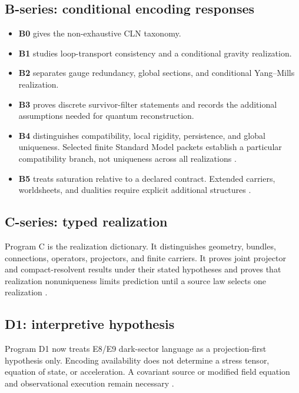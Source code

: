 \documentclass[11pt]{article}
\begin{document}
\subsection{B-series: conditional encoding responses}

\begin{itemize}
\item \textbf{B0} gives the non-exhaustive CLN taxonomy.
\item \textbf{B1} studies loop-transport consistency and a conditional gravity
realization.
\item \textbf{B2} separates gauge redundancy, global sections, and conditional
Yang--Mills realization.
\item \textbf{B3} proves discrete survivor-filter statements and records the
additional assumptions needed for quantum reconstruction.
\item \textbf{B4} distinguishes compatibility, local rigidity, persistence,
and global uniqueness.  Selected finite Standard Model packets establish a
particular compatibility branch, not uniqueness across all realizations
\cite{Nero2026_MTT_B4_StructuralRigidity}.
\item \textbf{B5} treats saturation relative to a declared contract.  Extended
carriers, worldsheets, and dualities require explicit additional structures
\cite{Nero2026_MTT_B5_SaturatedEncodings}.
\end{itemize}

\subsection{C-series: typed realization}

Program C is the realization dictionary.  It distinguishes geometry, bundles,
connections, operators, projectors, and finite carriers.  It proves joint
projector and compact-resolvent results under their stated hypotheses and
proves that realization nonuniqueness limits prediction until a source law
selects one realization \cite{Nero2026_MTT_C_Realizations}.

\subsection{D1: interpretive hypothesis}

Program D1 now treats E8/E9 dark-sector language as a projection-first
hypothesis only.  Encoding availability does not determine a stress tensor,
equation of state, or acceleration.  A covariant source or modified field
equation and observational execution remain necessary
\cite{Nero2026_MTT_D1_DarkSector}.
\end{document}
